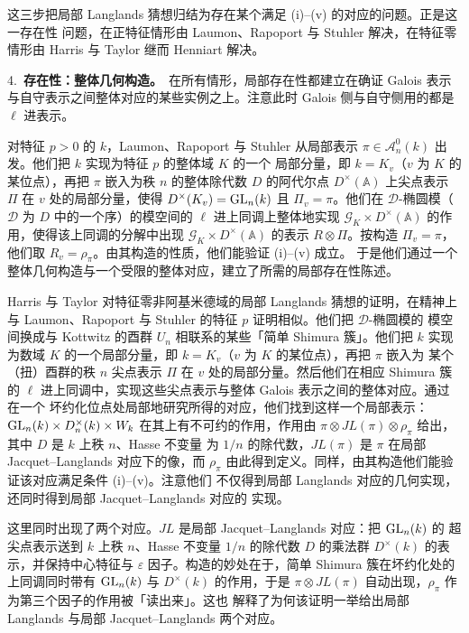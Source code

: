 这三步把局部 Langlands 猜想归结为存在某个满足 (i)--(v) 的对应的问题。正是这一存在性
问题，在正特征情形由 Laumon、Rapoport 与 Stuhler 解决，在特征零情形由 Harris 与
Taylor 继而 Henniart 解决。

4.~\textbf{存在性：整体几何构造。}\ 在所有情形，局部存在性都建立在确证 Galois 表示
与自守表示之间整体对应的某些实例之上。注意此时 Galois 侧与自守侧用的都是 $\ell$ 进表示。

对特征 $p>0$ 的 $k$，Laumon、Rapoport 与 Stuhler 从局部表示
$\pi\in\mathcal{A}_n^0(k)$ 出发。他们把 $k$ 实现为特征 $p$ 的整体域 $K$ 的一个
局部分量，即 $k=K_v$（$v$ 为 $K$ 的某位点），再把 $\pi$ 嵌入为秩 $n$ 的整体除代数
$D$ 的阿代尔点 $D^\times(\mathbb{A})$ 上尖点表示 $\Pi$ 在 $v$ 处的局部分量，使得
$D^\times(K_v)=\mathrm{GL}_n(k)$ 且 $\Pi_v=\pi$。他们在 $\mathcal{D}$-椭圆模（$\mathcal{D}$
为 $D$ 中的一个序）的模空间的 $\ell$ 进上同调上整体地实现
$\mathcal{G}_K\times D^\times(\mathbb{A})$ 的作用，使得该上同调的分解中出现
$\mathcal{G}_K\times D^\times(\mathbb{A})$ 的表示 $R\otimes\Pi$。按构造
$\Pi_v=\pi$，他们取 $R_v=\rho_\pi$。由其构造的性质，他们能验证 (i)--(v) 成立。
于是他们通过一个整体几何构造与一个受限的整体对应，建立了所需的局部存在性陈述。

Harris 与 Taylor 对特征零非阿基米德域的局部 Langlands 猜想的证明，在精神上与
Laumon、Rapoport 与 Stuhler 的特征 $p$ 证明相似。他们把 $\mathcal{D}$-椭圆模的
模空间换成与 Kottwitz 的酉群 $U_n$ 相联系的某些「简单 Shimura 簇」。他们把 $k$ 实现
为数域 $K$ 的一个局部分量，即 $k=K_v$（$v$ 为 $K$ 的某位点），再把 $\pi$ 嵌入为
某个（扭）酉群的秩 $n$ 尖点表示 $\Pi$ 在 $v$ 处的局部分量。然后他们在相应 Shimura 簇
的 $\ell$ 进上同调中，实现这些尖点表示与整体 Galois 表示之间的整体对应。通过在一个
坏约化位点处局部地研究所得的对应，他们找到这样一个局部表示：$\mathrm{GL}_n(k)\times
D_n^\times(k)\times W_k$ 在其上有不可约的作用，作用由
$\pi\otimes JL(\pi)\otimes\rho_\pi$ 给出，其中 $D$ 是 $k$ 上秩 $n$、Hasse 不变量
为 $1/n$ 的除代数，$JL(\pi)$ 是 $\pi$ 在局部 Jacquet--Langlands 对应下的像，而
$\rho_\pi$ 由此得到定义。同样，由其构造他们能验证该对应满足条件 (i)--(v)。注意他们
不仅得到局部 Langlands 对应的几何实现，还同时得到局部 Jacquet--Langlands 对应的
实现。
\begin{annote}
这里同时出现了两个对应。$JL$ 是局部 Jacquet--Langlands 对应：把 $\mathrm{GL}_n(k)$ 的
超尖点表示送到 $k$ 上秩 $n$、Hasse 不变量 $1/n$ 的除代数 $D$ 的乘法群
$D^\times(k)$ 的表示，并保持中心特征与 $\varepsilon$ 因子。构造的妙处在于，简单
Shimura 簇在坏约化处的上同调同时带有 $\mathrm{GL}_n(k)$ 与 $D^\times(k)$ 的作用，于是
$\pi\otimes JL(\pi)$ 自动出现，$\rho_\pi$ 作为第三个因子的作用被「读出来」。这也
解释了为何该证明一举给出局部 Langlands 与局部 Jacquet--Langlands 两个对应。
\par\vspace{0.15em}{\raggedleft 【来源：Harris--Taylor 2001, Introduction 与 Ch.~1；Carayol, S\'eminaire Bourbaki 857, Ast\'erisque 266 (2000), 191--243（A）】\par}
\end{annote}

